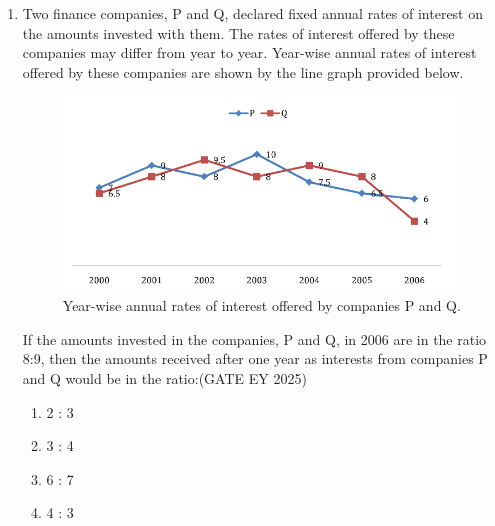 \begin{enumerate}[leftmargin=0pt,label=\textbf{Q.\arabic*}, resume]

\item Two finance companies, P and Q, declared fixed annual rates of interest on the amounts invested with them. The rates of interest offered by these companies may differ from year to year. Year-wise annual rates of interest offered by these companies are shown by the line graph provided below.


\begin{figure}
    \centering
    \includegraphics[width=0.9\columnwidth]{figs/imageQ6.png}
    \caption{Year-wise annual rates of interest offered by companies P and Q.}
    \label{fig:q6-rates}
\end{figure}

\newpage
If the amounts invested in the companies, P and Q, in 2006 are in the ratio 8:9, then the amounts received after one year as interests from companies P and Q would be in the ratio:\hfill {(GATE EY 2025)}

\begin{multicols}{2}
\begin{enumerate}
\item 2 : 3
\item 3 : 4
\item 6 : 7
\item 4 : 3
\end{enumerate}
\end{multicols}


\end{enumerate}

